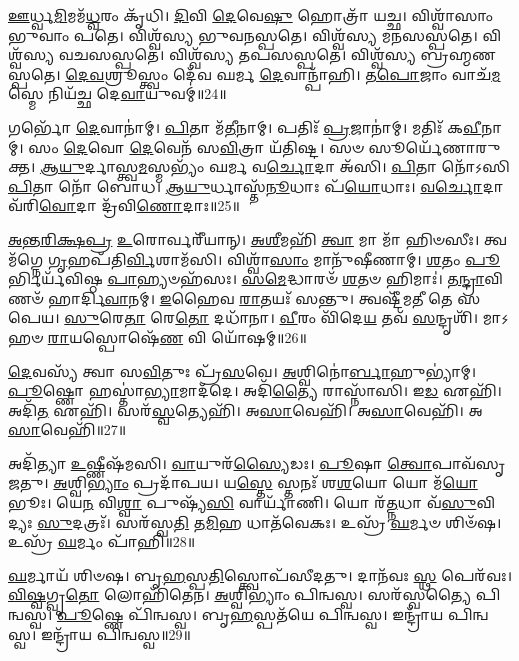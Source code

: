 \-\ul{𑌊}\-𑌰𑍍𑌧𑍍𑌵\-\ul{𑌮𑌿}\-𑌮𑌮᳴\-\ul{𑌧𑍍𑌵}\-𑌰𑌂 𑌕𑍃᳴𑌧𑌿। 
\-\ul{𑌦𑌿}\-𑌵𑌿 \ul{𑌦𑍇}\-𑌵𑍇\-\ul{𑌷𑍁} 𑌹𑍋𑌤𑍍𑌰𑌾᳴ 𑌯𑌚𑍍𑌛। 
𑌵𑌿𑌶𑍍𑌵𑌾᳴𑌸𑌾𑌂 𑌭𑍁𑌵𑌾𑌂 𑌪𑌤𑍇। 
𑌵𑌿𑌶𑍍𑌵᳴𑌸𑍍𑌯 𑌭𑍁𑌵𑌨𑌸𑍍𑌪𑌤𑍇। 
𑌵𑌿𑌶𑍍𑌵᳴𑌸𑍍𑌯 𑌮𑌨𑌸𑌸𑍍𑌪𑌤𑍇। 
𑌵𑌿𑌶𑍍𑌵᳴𑌸𑍍𑌯 𑌵𑌚𑌸𑌸𑍍𑌪𑌤𑍇। 
𑌵𑌿𑌶𑍍𑌵᳴𑌸𑍍𑌯 𑌤𑌪𑌸𑌸𑍍𑌪𑌤𑍇। 
𑌵𑌿𑌶𑍍𑌵᳴𑌸𑍍𑌯 𑌬𑍍𑌰𑌹𑍍𑌮𑌣𑌸𑍍𑌪𑌤𑍇। 
\-\ul{𑌦𑍇}\-\-\ul{𑌵}\-𑌶𑍍𑌰𑍂𑌸𑍍𑌤𑍍𑌵𑌂 𑌦𑍇᳴𑌵 𑌘𑌰𑍍𑌮 \ul{𑌦𑍇}\-𑌵𑌾𑌨𑍍𑌪𑌾᳴𑌹𑌿। 
\-\ul{𑌤}\-\-\ul{𑌪𑍋}\-𑌜𑌾𑌂 𑌵𑌾𑌚᳴\-\ul{𑌮}\-𑌸𑍍𑌮𑍇 𑌨𑌿𑌯᳴𑌚𑍍𑌛 𑌦𑍇\-\ul{𑌵𑌾}\-𑌯𑍁𑌵𑌮𑍍॑॥24॥

𑌗𑌰𑍍𑌭𑍋᳴ \ul{𑌦𑍇}\-𑌵𑌾𑌨𑌾॑𑌮𑍍। 
\-\ul{𑌪𑌿}\-𑌤𑌾 𑌮᳴\-\ul{𑌤𑍀}\-𑌨𑌾𑌮𑍍। 
𑌪𑌤𑌿𑌃᳴ \ul{𑌪𑍍𑌰}\-𑌜𑌾𑌨𑌾॑𑌮𑍍। 
𑌮𑌤𑌿𑌃᳴ 𑌕\-\ul{𑌵𑍀}\-𑌨𑌾𑌮𑍍। 
𑌸𑌂 \ul{𑌦𑍇}\-𑌵𑍋 \ul{𑌦𑍇}\-𑌵𑍇𑌨᳴ 𑌸\-\ul{𑌵𑌿}\-𑌤𑍍𑌰𑌾 𑌯᳴𑌤𑌿𑌷𑍍𑌟। 
𑌸𑍞 𑌸𑍂𑌰𑍍𑌯𑍇᳴𑌣𑌾𑌰𑍁𑌕𑍍𑌤। 
\-\ul{𑌆}\-\-\ul{𑌯𑍁}\-𑌰𑍍𑌦𑌾𑌸𑍍𑌤𑍍𑌵\-\ul{𑌮}\-𑌸𑍍𑌮𑌭𑍍𑌯𑌂᳴ 𑌘𑌰𑍍𑌮 𑌵\-\ul{𑌰𑍍𑌚𑍋}\-𑌦𑌾 𑌅᳴𑌸𑌿। 
\-\ul{𑌪𑌿}\-𑌤𑌾 𑌨𑍋᳴𑌽𑌸𑌿 \ul{𑌪𑌿}\-𑌤𑌾 𑌨𑍋᳴ 𑌬𑍋𑌧। 
\-\ul{𑌆}\-\-\ul{𑌯𑍁}\-𑌰𑍍𑌧𑌾𑌸𑍍𑌤᳴\-\ul{𑌨𑍂}\-𑌧𑌾𑌃 𑌪᳴\-\ul{𑌯𑍋}\-𑌧𑌾𑌃। 
\-\ul{𑌵}\-\-\ul{𑌰𑍍𑌚𑍋}\-𑌦𑌾 𑌵᳴𑌰𑌿\-\ul{𑌵𑍋}\-𑌦𑌾 𑌦𑍍𑌰᳴𑌵𑌿\-\ul{𑌣𑍋}\-𑌦𑌾𑌃॥25॥

\-\ul{𑌅}\-\-\ul{𑌨𑍍𑌤}\-\-\ul{𑌰𑌿}\-\-\ul{𑌕𑍍𑌷}\-\-\ul{𑌪𑍍𑌰} \ul{𑌉}\-𑌰𑍋𑌰𑍍𑌵𑌰𑍀᳴𑌯𑌾𑌨𑍍। 
\-\ul{𑌅}\-\-\ul{𑌶𑍀}\-𑌮𑌹𑌿᳴ \ul{𑌤𑍍𑌵𑌾} 𑌮𑌾 𑌮𑌾᳴ 𑌹𑌿𑍞𑌸𑍀𑌃। 
𑌤𑍍𑌵𑌮᳴𑌗𑍍𑌨𑍇 \ul{𑌗𑍃}\-𑌹𑌪᳴𑌤𑌿\-\ul{𑌰𑍍𑌵𑌿}\-𑌶𑌾𑌮᳴𑌸𑌿। 
𑌵𑌿𑌶𑍍𑌵𑌾᳴\-\ul{𑌸𑌾𑌂} 𑌮𑌾𑌨𑍁᳴𑌷𑍀𑌣𑌾𑌮𑍍। 
\-\ul{𑌶}\-𑌤𑌂 \ul{𑌪𑍂}\-𑌰𑍍𑌭𑌿𑌰𑍍𑌯᳴𑌵𑌿𑌷𑍍𑌠 \ul{𑌪𑌾}\-𑌹𑍍𑌯𑍞𑌹᳴𑌸𑌃। 
\-\ul{𑌸}\-\-\ul{𑌮𑍇}\-𑌦𑍍𑌧𑌾𑌰𑍞᳴ \ul{𑌶}\-𑌤𑍞 𑌹𑌿𑌮𑌾𑌃॑। 
\-\ul{𑌤}\-\-\ul{𑌨𑍍𑌦𑍍𑌰𑌾}\-𑌵𑌿𑌣𑍞᳴ 𑌹𑌾𑌰𑍍𑌦𑌿\-\ul{𑌵𑌾}\-𑌨𑌮𑍍। 
\-\ul{𑌇}\-𑌹𑍈𑌵 \ul{𑌰𑌾}\-𑌤𑌯𑌃᳴ 𑌸𑌨𑍍𑌤𑍁। 
𑌤𑍍𑌵𑌷𑍍𑌟𑍀᳴𑌮𑌤𑍀 𑌤𑍇 𑌸𑌪𑍇𑌯। 
\-\ul{𑌸𑍁}\-𑌰𑍇\-\ul{𑌤𑌾} 𑌰𑍇\-\ul{𑌤𑍋} 𑌦𑌧𑌾᳴𑌨𑌾। 
\-\ul{𑌵𑍀}\-𑌰𑌂  𑌵𑌿᳴𑌦𑍇\-\ul{𑌯} 𑌤𑌵᳴ \ul{𑌸}\-𑌨𑍍𑌦𑍃𑌶𑌿᳴। 
𑌮𑌾𑌽𑌹𑍞 \ul{𑌰𑌾}\-𑌯𑌸𑍍𑌪𑍋𑌷𑍇᳴\-\ul{𑌣} 𑌵𑌿 𑌯𑍋᳴𑌷𑌮𑍍॥26॥
\anuvakamend[\-\ul{𑌰𑍋}\-\-\ul{𑌚}\-\-\ul{𑌤𑍇} 𑌸𑍂𑌰𑍍𑌯𑌾᳴𑌯 𑌤𑍍𑌵𑌾 𑌦𑍇\-\ul{𑌵𑌾}\-𑌯𑍁𑌵𑌂᳴ 𑌦𑍍𑌰𑌵𑌿\-\ul{𑌣𑍋}\-𑌦𑌾 𑌦𑌧𑌾᳴\-\ul{𑌨𑌾} 𑌦𑍍𑌵𑍇 𑌚᳴]


\-\ul{𑌦𑍇}\-𑌵𑌸𑍍𑌯᳴ 𑌤𑍍𑌵𑌾 𑌸\-\ul{𑌵𑌿}\-𑌤𑍁𑌃 𑌪𑍍𑌰᳴\-\ul{𑌸}\-𑌵𑍇। 
\-\ul{𑌅}\-𑌶𑍍𑌵𑌿𑌨𑍋॑\-\ul{𑌰𑍍𑌬𑌾}\-𑌹𑍁𑌭𑍍𑌯𑌾॑𑌮𑍍। 
\-\ul{𑌪𑍂}\-𑌷𑍍𑌣𑍋 𑌹𑌸𑍍𑌤𑌾॑\-\ul{𑌭𑍍𑌯𑌾}\-𑌮𑌾𑌦᳴𑌦𑍇। 
𑌅𑌦𑌿᳴\-\ul{𑌤𑍍𑌯𑍈} 𑌰𑌾𑌸𑍍𑌨𑌾᳴𑌸𑌿। 
𑌇\-\ul{𑌡} 𑌏𑌹𑌿᳴। 
𑌅𑌦𑌿᳴\-\ul{𑌤} 𑌏𑌹𑌿᳴। 
𑌸𑌰᳴\-\ul{𑌸𑍍𑌵}\-𑌤𑍍𑌯𑍇𑌹𑌿᳴। 
𑌅\-\ul{𑌸𑌾}\-𑌵𑍇𑌹𑌿᳴। 
𑌅\-\ul{𑌸𑌾}\-𑌵𑍇𑌹𑌿᳴। 
𑌅\-\ul{𑌸𑌾}\-𑌵𑍇𑌹𑌿᳴॥27॥

𑌅𑌦𑌿᳴𑌤𑍍𑌯𑌾 \ul{𑌉}\-𑌷𑍍𑌣𑍀𑌷᳴𑌮𑌸𑌿। 
\-\ul{𑌵𑌾}\-𑌯𑍁𑌰᳴\-\ul{𑌸𑍍𑌯𑍈}\-𑌡𑌃। 
\-\ul{𑌪𑍂}\-𑌷𑌾 \ul{𑌤𑍍𑌵𑍋}\-𑌪𑌾𑌵᳴𑌸𑍃𑌜𑌤𑍁। 
\-\ul{𑌅}\-𑌶𑍍𑌵𑌿\-\ul{𑌭𑍍𑌯𑌾𑌂} 𑌪𑍍𑌰𑌦𑌾᳴𑌪𑌯। 
𑌯\-\ul{𑌸𑍍𑌤𑍇} 𑌸𑍍𑌤𑌨𑌃᳴ 𑌶\-\ul{𑌶}\-𑌯𑍋 𑌯𑍋 𑌮᳴\-\ul{𑌯𑍋}\-𑌭𑍂𑌃। 
𑌯𑍇\-\ul{𑌨} 𑌵𑌿\-\ul{𑌶𑍍𑌵𑌾} 𑌪𑍁𑌷𑍍𑌯᳴\-\ul{𑌸𑌿} 𑌵𑌾𑌰𑍍𑌯𑌾᳴𑌣𑌿। 
𑌯𑍋 𑌰᳴\-\ul{𑌤𑍍𑌨}\-𑌧𑌾 𑌵᳴\-\ul{𑌸𑍁}\-𑌵𑌿𑌦𑍍𑌯𑌃 \ul{𑌸𑍁}\-𑌦𑌤𑍍𑌰𑌃᳴। 
𑌸𑌰᳴𑌸𑍍𑌵\-\ul{𑌤𑌿} 𑌤\-\ul{𑌮𑌿}\-𑌹 𑌧𑌾𑌤᳴𑌵𑍇𑌕𑌃। 
𑌉𑌸𑍍𑌰᳴ \ul{𑌘}\-𑌰𑍍𑌮𑍞 𑌶𑌿𑍞᳴𑌷। 
𑌉𑌸𑍍𑌰᳴ \ul{𑌘}\-𑌰𑍍𑌮𑌂 𑌪𑌾᳴𑌹𑌿॥28॥

\-\ul{𑌘}\-𑌰𑍍𑌮𑌾𑌯᳴ 𑌶𑌿𑍞𑌷। 
𑌬𑍃\-\ul{𑌹}\-𑌸𑍍𑌪\-\ul{𑌤𑌿}\-𑌸𑍍𑌤𑍍𑌵𑍋𑌪᳴𑌸𑍀𑌦𑌤𑍁। 
𑌦𑌾𑌨᳴𑌵𑌃 \ul{𑌸𑍍𑌥} 𑌪𑍇𑌰᳴𑌵𑌃। 
\-\ul{𑌵𑌿}\-\-\ul{𑌷𑍍𑌵}\-𑌗𑍍𑌵𑍃\-\ul{𑌤𑍋} 𑌲𑍋𑌹𑌿᳴𑌤𑍇𑌨। 
\-\ul{𑌅}\-𑌶𑍍𑌵𑌿𑌭𑍍𑌯𑌾𑌂॑ 𑌪𑌿𑌨𑍍𑌵𑌸𑍍𑌵। 
𑌸𑌰᳴𑌸𑍍𑌵𑌤𑍍𑌯𑍈 𑌪𑌿𑌨𑍍𑌵𑌸𑍍𑌵। 
\-\ul{𑌪𑍂}\-𑌷𑍍𑌣𑍇 𑌪𑌿᳴𑌨𑍍𑌵𑌸𑍍𑌵। 
𑌬𑍃\-\ul{𑌹}\-𑌸𑍍𑌪𑌤᳴𑌯𑍇 𑌪𑌿𑌨𑍍𑌵𑌸𑍍𑌵। 
𑌇𑌨𑍍𑌦𑍍𑌰𑌾᳴𑌯 𑌪𑌿𑌨𑍍𑌵𑌸𑍍𑌵। 
𑌇𑌨𑍍𑌦𑍍𑌰𑌾᳴𑌯 𑌪𑌿𑌨𑍍𑌵𑌸𑍍𑌵॥29॥

